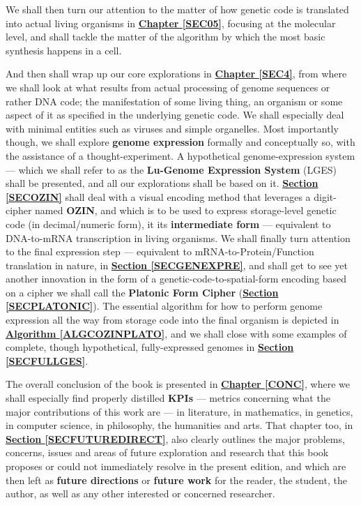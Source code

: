\documentclass[a4paper, 18pt]{book} %
\begin{document}
We shall then turn our attention to the matter of how genetic code is translated into actual living organisms in \textbf{\hyperref[SEC05]{Chapter \ref{SEC05}}}, focusing at the molecular level, and shall tackle the matter of the algorithm by which the most basic synthesis happens in a cell.


And then shall wrap up our core explorations in \textbf{\hyperref[SEC4]{Chapter \ref{SEC4}}}, from where we shall look at what results from actual processing of genome sequences or rather DNA code; the manifestation of some living thing, an organism or some aspect of it as specified in the underlying genetic code. We shall especially deal with minimal entities such as viruses and simple organelles. Most importantly though, we shall explore \textbf{genome expression} formally and conceptually so, with the assistance of a thought-experiment. A hypothetical genome-expression system --- which we shall refer to as the \textbf{Lu-Genome Expression System} (LGES) shall be presented, and all our explorations shall be based on it. \textbf{\hyperref[SECOZIN]{Section \ref{SECOZIN}}} shall deal with a visual encoding method that leverages a digit-cipher named \textbf{OZIN}, and which is to be used to express storage-level genetic code (in decimal/numeric form), it its \textbf{intermediate form} --- equivalent to DNA-to-mRNA transcription in living organisms. We shall finally turn attention to the final expression step --- equivalent to mRNA-to-Protein/Function translation in nature, in \textbf{\hyperref[SECGENEXPRE]{Section \ref{SECGENEXPRE}}}, and shall get to see yet another innovation in the form of a genetic-code-to-spatial-form encoding based on a cipher we shall call the \textbf{Platonic Form Cipher} (\textbf{\hyperref[SECPLATONIC]{Section \ref{SECPLATONIC}}}). The essential algorithm for how to perform genome expression all the way from storage code into the final organism is depicted in \textbf{\hyperref[ALGCOZINPLATO]{Algorithm \ref{ALGCOZINPLATO}}}, and we shall close with some examples of complete, though hypothetical, fully-expressed genomes in \textbf{\hyperref[SECFULLGES]{Section \ref{SECFULLGES}}}.

The overall conclusion of the book is presented in \textbf{\hyperref[CONC]{Chapter \ref{CONC}}}, where we shall especially find properly distilled \textbf{KPIs} --- metrics concerning what the major contributions of this work are --- in literature, in mathematics, in genetics, in computer science, in philosophy, the humanities and arts. That chapter too, in \textbf{\hyperref[SECFUTUREDIRECT]{Section \ref{SECFUTUREDIRECT}}}, also clearly outlines the major problems, concerns, issues and areas of future exploration and research that this book proposes or could not immediately resolve in the present edition, and which are then left as \textbf{future directions} or \textbf{future work} for the reader, the student, the author, as well as any other interested or concerned researcher.
\end{document}
